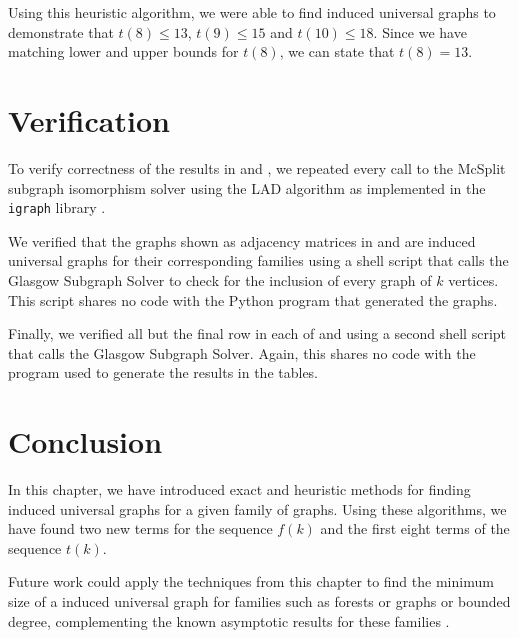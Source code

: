 Using this heuristic algorithm, we were able to find induced universal graphs
to demonstrate that $t(8) \leq 13$, $t(9) \leq 15$ and $t(10) \leq 18$.
Since we have matching lower and upper bounds for $t(8)$, we can state
that $t(8) = 13$.

\section{Verification}\label{sec:verification}

To verify correctness of the results in
 and , we repeated every call to
the McSplit subgraph isomorphism solver using the LAD algorithm \citep{DBLP:journals/ai/Solnon10}
as implemented in the \texttt{igraph} library \citep{igraph}.

We verified that the graphs shown as adjacency matrices in 
and  are induced universal graphs for their corresponding families
using a shell script that calls the Glasgow Subgraph Solver
\citep{DBLP:conf/cp/McCreeshP15,DBLP:conf/gg/McCreeshP020} to check for the
inclusion of every graph of $k$ vertices.
This script shares no code with the Python program that generated the graphs.

Finally, we verified all but the final row in each of 
and  using a second shell script that calls the Glasgow
Subgraph Solver.  Again, this shares no code with the program used to generate
the results in the tables.

\section{Conclusion}

In this chapter, we have introduced exact and heuristic methods for
finding induced universal graphs for a given family of graphs.  Using these algorithms,
we have found two new terms for the sequence $f(k)$ and the first eight terms
of the sequence $t(k)$.

Future work could apply the techniques from this chapter to find
the minimum size of a induced universal graph for families such as
forests or graphs or bounded degree, complementing the known asymptotic
results for these families \citep{DBLP:journals/jacm/AlstrupDK17,
DBLP:conf/icalp/AbrahamsenAHKS17}.
